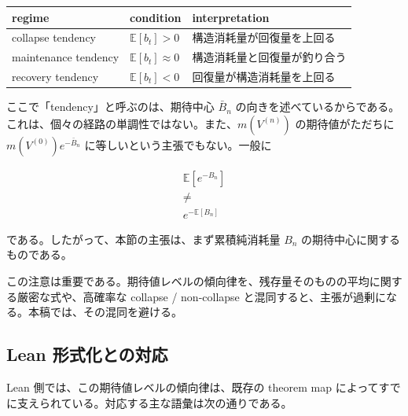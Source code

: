 \documentclass[12pt,a4paper]{article}
\begin{document}
{\def\LTcaptype{table} %
\begin{longtable}[]{@{}
  >{\raggedright\arraybackslash}p{}
  >{\raggedright\arraybackslash}p{}
  >{\raggedright\arraybackslash}p{}@{}}
\toprule\noalign{}
\begin{minipage}[b]{\linewidth}\raggedright
regime
\end{minipage} & \begin{minipage}[b]{\linewidth}\raggedright
condition
\end{minipage} & \begin{minipage}[b]{\linewidth}\raggedright
interpretation
\end{minipage} \\
\midrule\noalign{}
\endhead
\bottomrule\noalign{}
\endlastfoot
collapse tendency & \(\mathbb E[b_t] > 0\) & 構造消耗量が回復量を上回る \\
maintenance tendency & \(\mathbb E[b_t] \approx 0\) & 構造消耗量と回復量が釣り合う \\
recovery tendency & \(\mathbb E[b_t] < 0\) & 回復量が構造消耗量を上回る \\
\end{longtable}
}

ここで「tendency」と呼ぶのは、期待中心 \(\bar B_{n}\) の向きを述べているからである。これは、個々の経路の単調性ではない。また、\(m(V^{(n)})\) の期待値がただちに \(m(V^{(0)})e^{-\bar B_{n}}\) に等しいという主張でもない。一般に

\[
\begin{aligned}
\mathbb E[e^{-B_{n}}] \\
\ne \\
e^{-\mathbb E[B_{n}]}
\end{aligned}
\]

である。したがって、本節の主張は、まず累積純消耗量 \(B_{n}\) の期待中心に関するものである。

この注意は重要である。期待値レベルの傾向律を、残存量そのものの平均に関する厳密な式や、高確率な collapse / non-collapse と混同すると、主張が過剰になる。本稿では、その混同を避ける。

\subsection{Lean 形式化との対応}\label{lean-ux5f62ux5f0fux5316ux3068ux306eux5bfeux5fdc}

Lean 側では、この期待値レベルの傾向律は、既存の theorem map によってすでに支えられている。対応する主な語彙は次の通りである。
\end{document}
